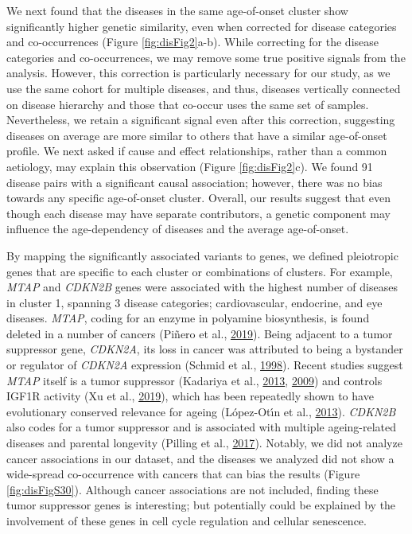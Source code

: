 \documentclass[12pt,twoside]{unicam}
\begin{document}
We next found that the diseases in the same age-of-onset cluster show significantly higher genetic similarity, even when corrected for disease categories and co-occurrences (Figure \ref{fig:disFig2}a-b). While correcting for the disease categories and co-occurrences, we may remove some true positive signals from the analysis. However, this correction is particularly necessary for our study, as we use the same cohort for multiple diseases, and thus, diseases vertically connected on disease hierarchy and those that co-occur uses the same set of samples. Nevertheless, we retain a significant signal even after this correction, suggesting diseases on average are more similar to others that have a similar age-of-onset profile. We next asked if cause and effect relationships, rather than a common aetiology, may explain this observation (Figure \ref{fig:disFig2}c). We found 91 disease pairs with a significant causal association; however, there was no bias towards any specific age-of-onset cluster. Overall, our results suggest that even though each disease may have separate contributors, a genetic component may influence the age-dependency of diseases and the average age-of-onset.

By mapping the significantly associated variants to genes, we defined pleiotropic genes that are specific to each cluster or combinations of clusters. For example, \emph{MTAP} and \emph{CDKN2B} genes were associated with the highest number of diseases in cluster 1, spanning 3 disease categories; cardiovascular, endocrine, and eye diseases. \emph{MTAP}, coding for an enzyme in polyamine biosynthesis, is found deleted in a number of cancers (Piñero et al., \protect\hyperlink{ref-Pinero2019}{2019}). Being adjacent to a tumor suppressor gene, \emph{CDKN2A}, its loss in cancer was attributed to being a bystander or regulator of \emph{CDKN2A} expression (Schmid et al., \protect\hyperlink{ref-Schmid1998}{1998}). Recent studies suggest \emph{MTAP} itself is a tumor suppressor (Kadariya et al., \protect\hyperlink{ref-Kadariya2013}{2013}, \protect\hyperlink{ref-Kadariya2009}{2009}) and controls IGF1R activity (Xu et al., \protect\hyperlink{ref-Xu2019}{2019}), which has been repeatedly shown to have evolutionary conserved relevance for ageing (López-Otı́n et al., \protect\hyperlink{ref-Lopez-Otin2013}{2013}). \emph{CDKN2B} also codes for a tumor suppressor and is associated with multiple ageing-related diseases and parental longevity (Pilling et al., \protect\hyperlink{ref-Pilling2017}{2017}). Notably, we did not analyze cancer associations in our dataset, and the diseases we analyzed did not show a wide-spread co-occurrence with cancers that can bias the results (Figure \ref{fig:disFigS30}). Although cancer associations are not included, finding these tumor suppressor genes is interesting; but potentially could be explained by the involvement of these genes in cell cycle regulation and cellular senescence.
\end{document}
